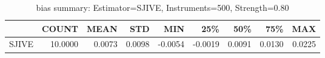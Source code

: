 \begin{table}[ht]
\centering
\caption{bias summary: Estimator=SJIVE, Instruments=500, Strength=0.80}
\begin{tabular}{lrrrrrrrr}
\toprule
 & COUNT & MEAN & STD & MIN & 25\% & 50\% & 75\% & MAX \\
\midrule
SJIVE & 10.0000 & 0.0073 & 0.0098 & -0.0054 & -0.0019 & 0.0091 & 0.0130 & 0.0225 \\
\bottomrule
\end{tabular}
\end{table}
